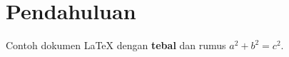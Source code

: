 \documentclass{article}
\begin{document}
\section{Pendahuluan}
Contoh dokumen LaTeX dengan \textbf{tebal} dan rumus $a^2+b^2=c^2$.
\end{document}
